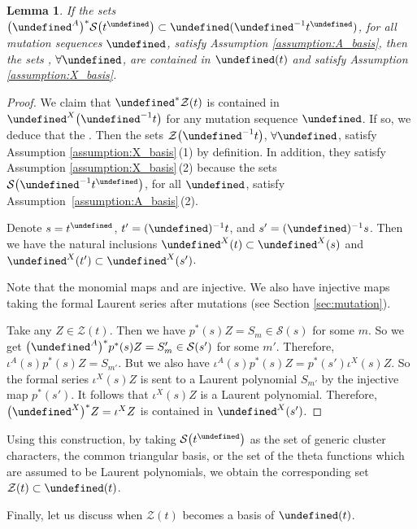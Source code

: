 \documentclass[10pt,a4paper]{amsart}
\newcommand{\opname}[1]{\operatorname{\mathsf{#1}}}
\newcommand{\cS}{{\mathcal S}}
\newcommand{\cZ}{{\mathcal Z}}
\let\upClAlg\undefined
\let\XClAlg\undefined
\let\LP\undefined
\let\prin\undefined
\let\seq\undefined
\let\hLP\undefined
\newcommand{\upClAlg}{\mathcal{U}^A}
\newcommand{\XClAlg}{\mathcal{U}^X}
\newcommand{\LP}{{\mathcal{LP}}}
\newcommand{\prin}{{\opname{prin}}}
\newcommand{\seq}{\boldsymbol{\mu}}%
\newcommand{\hLP}{\widehat{\mathcal{LP}}}
\numberwithin{equation}{section}
\newtheorem{Lemma}[Theorem]{Lemma}
\begin{document}
\begin{Lemma}\label{lem:X_set_univ_Laurent}
If the sets $\big(\seq^A\big)^{*}\cS\big(t^{\prin}\big)\subset\upClAlg(\seq^{-1} t^{\prin})$,
for all mutation sequences $\seq$, satisfy Assumption {\rm \ref{assumption:A_basis}},
then the sets \smash{$\cZ\big(\seq^{-1}t\big):=\big(\seq^X\big)^{*}\cZ(t)$}, $\forall\seq$, are contained in $\XClAlg(t)$ and satisfy Assumption
{\rm \ref{assumption:X_basis}}.
\end{Lemma}
\begin{proof}
We claim that $\seq^* \cZ(t)$ is contained in $\LP^X\big(\seq^{-1} t\big)$ for any mutation sequence $\seq$. If so, we deduce that the \smash{$\cZ(t)\subset \cap_{\forall \seq}(\seq^*)^{-1}\LP^X\big(\seq^{-1}t\big) =\XClAlg(t)$}. Then the sets $\cZ\big(\seq^{-1}t\big)$, $\forall \seq$, satisfy Assumption \ref{assumption:X_basis}\,(1) by definition. In addition, they satisfy Assumption \ref{assumption:X_basis}\,(2) because the sets~$\cS\big(\seq^{-1} t^{\prin}\big)$, for all $\seq$, satisfy Assumption~\ref{assumption:A_basis}\,(2).

Denote $s=t^{\prin}$, $t'=(\seq)^{-1} t$, and $s'=(\seq)^{-1} s$. Then we have the natural inclusions $\LP^X(t)\subset \LP^X(s)$ and $\LP^X(t')\subset \LP^X(s')$.

Note that the monomial maps \smash{$p^*(s)\colon\LP^X(s)\rightarrow \LP^A(s)$} and \smash{$p^*(s')\colon\hLP^X(s)\rightarrow \hLP^A(s)$} are injective. We also have injective maps \smash{$\iota^\bullet\colon\LP^\bullet(s)\rightarrow \hLP^\bullet (s')$} taking the formal Laurent series after mutations (see Section \ref{sec:mutation}).


Take any $Z\in \cZ(t)$. Then we have $p^*(s)Z=S_m\in \cS(s)$ for some $m$. So we get $\big(\seq^A\big)^{*}p^{*}(s)Z=S_m'\in \cS(s')$ for some $m'$. Therefore, $\iota^A(s)p^*(s)Z=S_{m'}$. But we also have $\iota^A(s)p^*(s)Z=p^*(s')\iota^X(s)Z$. So the formal series $\iota^X(s)Z$ is sent to a Laurent polynomial $S_{m'}$ by the injective map $p^*(s')$. It follows that $\iota^X(s)Z$ is a Laurent polynomial. Therefore, $\big(\seq^X\big)^*Z=\iota^X Z$ is contained in $\LP^X(s')$.
\end{proof}

Using this construction, by taking $\cS\big(t^{\prin}\big)$ as the set of
generic cluster characters, the common triangular basis, or the set
of the theta functions which are assumed to be Laurent polynomials, we obtain the corresponding
set $\cZ(t)\subset\XClAlg(t)$.

Finally, let us discuss when $\cZ(t)$ becomes a basis of $\XClAlg(t)$.
\end{document}
